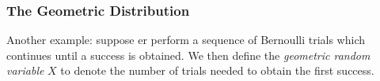\documentclass{article}
\theoremstyle{definition}
\begin{document}
\subsubsection{The Geometric Distribution}
Another example: suppose er perform a sequence of Bernoulli trials which continues until a success is obtained. We then define the \emph{geometric random variable} $ X $ to denote the number of trials needed to obtain the first success.
\end{document}
